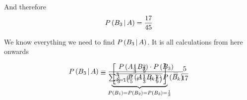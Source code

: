\documentclass[14pt,fleqn]{extarticle}
\begin{document}
\begin{problem}
\begin{step}
\begin{options}
            And therefore 
       \[ P\left(B_3\,\vert\,A\right) = \frac{17}{45} \]
        
    \end{options} 
     \reason 
       
     We know everything we need to find $P\left(B_3\,\vert\,A\right)$. It is all 
     calculations from here onwards
     
     \begin{align}
	P\left(B_3\,\vert\,A\right) &= \dfrac{P\left(A\,\vert\,B_3\right)\cdot P\left( B_3\right)}{\sum_{k=1}^3 P\left(A\,\vert\,B_k\right)\cdot P\left( B_k\right)} \\[-30pt]
	&= \underbrace{\left[\dfrac{\frac{1}{3}\cdot \frac{2}{9}}{\frac{1}{3}\cdot \left(\frac{1}{5}+\frac{1}{3}+\frac{2}{9} \right)} \right]}_{P\left( B_1\right)=P\left( B_2\right) = P\left( B_3\right) = \frac{1}{3}} = \frac{5}{17}
\end{align}  
\end{step}

\end{problem} 
\end{document}
